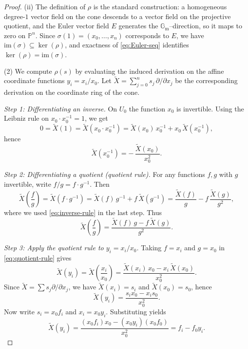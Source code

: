 \documentclass[11pt]{article}
\theoremstyle{plain}
\newcommand{\PP}{\mathbb{P}}
\newcommand{\Gm}{\mathbb{G}_{\mathrm{m}}}
\begin{document}
\begin{proof}
(ii) The definition of $\rho$ is the standard construction: a homogeneous degree-$1$
vector field on the cone descends to a vector field on the projective quotient, and
the Euler vector field $E$ generates the $\Gm$--direction, so it maps to zero on $\PP^n$.
Since $\sigma(1)=(x_0,\dots,x_n)$ corresponds to $E$, we have $\mathrm{im}(\sigma)\subseteq
\ker(\rho)$, and exactness of \eqref{eq:Euler-seq} identifies $\ker(\rho)=\mathrm{im}(\sigma)$.

(2) We compute $\rho(s)$ by evaluating the induced derivation on the affine coordinate
functions $y_i=x_i/x_0$.  Let $\widetilde{X}=\sum_{j=0}^n s_j\,\partial/\partial x_j$
be the corresponding derivation on the coordinate ring of the cone.

\smallskip
\noindent\emph{Step 1: Differentiating an inverse.}
On $U_0$ the function $x_0$ is invertible.  Using the Leibniz rule on
$x_0\cdot x_0^{-1}=1$, we get
\[
0=\widetilde{X}(1)=\widetilde{X}(x_0\cdot x_0^{-1})
=\widetilde{X}(x_0)\,x_0^{-1}+x_0\,\widetilde{X}(x_0^{-1}),
\]
hence
\begin{equation}\label{eq:inverse-rule}
\widetilde{X}(x_0^{-1})=-\,\frac{\widetilde{X}(x_0)}{x_0^2}.
\end{equation}


\noindent\emph{Step 2: Differentiating a quotient (quotient rule).}
For any functions $f,g$ with $g$ invertible, write $f/g=f\cdot g^{-1}$.  Then
\[
\widetilde{X}\!\left(\frac{f}{g}\right)
=\widetilde{X}(f\cdot g^{-1})
=\widetilde{X}(f)\,g^{-1}+f\,\widetilde{X}(g^{-1})
=\frac{\widetilde{X}(f)}{g}-f\,\frac{\widetilde{X}(g)}{g^2},
\]
where we used \eqref{eq:inverse-rule} in the last step.  Thus
\begin{equation}\label{eq:quotient-rule}
\widetilde{X}\!\left(\frac{f}{g}\right)
=\frac{\widetilde{X}(f)\,g-f\,\widetilde{X}(g)}{g^2}.
\end{equation}

\smallskip
\noindent\emph{Step 3: Apply the quotient rule to $y_i=x_i/x_0$.}
Taking $f=x_i$ and $g=x_0$ in \eqref{eq:quotient-rule} gives
\[
\widetilde{X}(y_i)
=\widetilde{X}\!\left(\frac{x_i}{x_0}\right)
=\frac{\widetilde{X}(x_i)\,x_0-x_i\,\widetilde{X}(x_0)}{x_0^2}.
\]
Since $\widetilde{X}=\sum s_j\partial/\partial x_j$, we have
$\widetilde{X}(x_i)=s_i$ and $\widetilde{X}(x_0)=s_0$, hence
\[
\widetilde{X}(y_i)=\frac{s_i x_0-x_i s_0}{x_0^2}.
\]
Now write $s_i=x_0 f_i$ and $x_i=x_0 y_i$.  Substituting yields
\[
\widetilde{X}(y_i)=\frac{(x_0 f_i)x_0-(x_0 y_i)(x_0 f_0)}{x_0^2}
=f_i-f_0 y_i.
\]


\end{proof}
\end{document}
